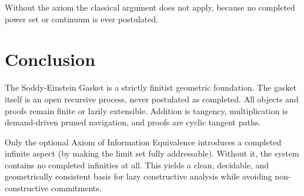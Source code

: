\documentclass[11pt,oneside]{article}
\begin{document}
Without the axiom the classical argument does not apply, because no completed power set or continuum is ever postulated.

\section{Conclusion}
The Soddy-Einstein Gasket is a strictly finitist geometric foundation. The gasket itself is an open recursive process, never postulated as completed. All objects and proofs remain finite or lazily extensible. Addition is tangency, multiplication is demand-driven pruned navigation, and proofs are cyclic tangent paths.

Only the optional Axiom of Information Equivalence introduces a completed infinite aspect (by making the limit set fully addressable). Without it, the system contains no completed infinities at all. This yields a clean, decidable, and geometrically consistent basis for lazy constructive analysis while avoiding non-constructive commitments.
\end{document}
